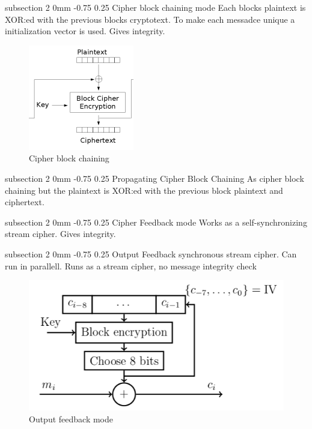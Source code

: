 \documentclass[a4paper,11pt]{article}
\makeatletter
\renewcommand{\subsection}{\@startsection
   {subsection}%
   {2}%
   {0mm}%
   {-0.75\baselineskip}%
   {0.25\baselineskip}%
   {\rmfamily\normalfont\slshape\normalsize}}%
\makeatother
\begin{document}
\subsection{Cipher block chaining mode} 
Each blocks plaintext is XOR:ed with the previous blocks cryptotext. To make each messadce unique a initialization vector is used. Gives integrity.
\begin{figure}[H]
  \centering
  \includegraphics[scale=0.6]{cbc.png}
  \caption{Cipher block chaining}
\end{figure}


\subsection{Propagating Cipher Block Chaining}
As cipher block chaining but the plaintext is XOR:ed with the previous block plaintext and ciphertext. 

\subsection{Cipher Feedback mode}
Works as a self-synchronizing stream cipher. Gives integrity.

\subsection{Output Feedback}
synchronous stream cipher. Can run in parallell. Runs as a stream cipher, no message integrity check
\begin{figure}[H]
  \centering
  \includegraphics[scale=0.4]{ofm.png}
  \caption{Output feedback mode}
\end{figure}
\end{document}
